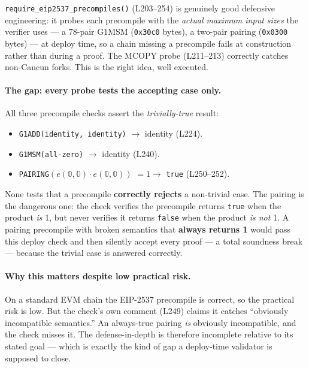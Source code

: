 \texttt{require\_\allowbreak{}eip2537\_\allowbreak{}precompiles()} (L203--254) is genuinely
good defensive engineering: it probes each precompile with the
\emph{actual maximum input sizes} the verifier uses --- a
78-pair G1MSM (\texttt{0x30c0} bytes), a two-pair pairing
(\texttt{0x0300} bytes) --- at deploy time, so a chain missing a
precompile fails at construction rather than during a proof.
The MCOPY probe (L211--213) correctly catches non-Cancun forks.
This is the right idea, well executed.

\paragraph{The gap: every probe tests the accepting case only.}
All three precompile checks assert the \emph{trivially-true}
result:
\begin{itemize}[leftmargin=1.4em,itemsep=2pt]
\item \texttt{G1ADD(identity, identity)} $\to$ identity (L224).
\item \texttt{G1MSM(all-zero)} $\to$ identity (L240).
\item \texttt{PAIRING}$(e(\mathbb{0},\mathbb{0})\cdot
  e(\mathbb{0},\mathbb{0}))$ $= 1 \to$ \texttt{true} (L250--252).
\end{itemize}
None tests that a precompile \textbf{correctly rejects} a
non-trivial case. The pairing is the dangerous one: the check
verifies the precompile returns \texttt{true} when the product
\emph{is} 1, but never verifies it returns \texttt{false} when
the product \emph{is not} 1. A pairing precompile with broken
semantics that \textbf{always returns 1} would pass this deploy
check and then silently accept every proof --- a total soundness
break --- because the trivial case is answered correctly.

\paragraph{Why this matters despite low practical risk.}
On a standard EVM chain the EIP-2537 precompile is correct, so
the practical risk is low. But the check's own comment (L249)
claims it catches ``obviously incompatible semantics.'' An
always-true pairing \emph{is} obviously incompatible, and the
check misses it. The defense-in-depth is therefore incomplete
relative to its stated goal --- which is exactly the kind of gap
a deploy-time validator is supposed to close.

